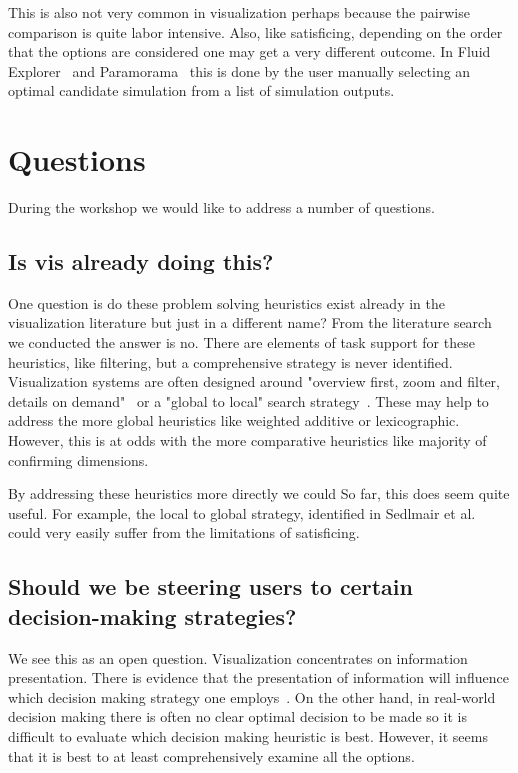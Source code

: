 This is also not very common in visualization perhaps because the pairwise
comparison is quite labor intensive. Also, like satisficing, depending on the
order that the options are considered one may get a very different outcome. In
Fluid Explorer~\cite{Bruckner:2010} and Paramorama~\citep{Pretorius:2011} this
is done by the user manually selecting an optimal candidate simulation from 
a list of simulation outputs.


\section{Questions}\label{questions}

During the workshop we would like to address a number of questions.

\subsection{Is vis already doing this?}
\label{is-vis-already-doing-this}

One question is do these problem solving heuristics exist already in the
visualization literature but just in a different name? From the literature
search we conducted the answer is no. There are elements of task support for
these heuristics, like filtering, but a comprehensive strategy is never
identified. Visualization systems are often designed around 
"overview first, zoom and filter, details on demand"~\cite{Shneiderman:1996} or
a "global to local" search strategy~\cite{Sedlmair:2014}. These may help to
address the more global heuristics like weighted additive or lexicographic.
However, this is at odds with the more comparative heuristics like majority
of confirming dimensions. 

By addressing these heuristics more directly we could 
So far, this does seem quite useful. For example, the local to global
strategy, identified in Sedlmair et al.~\citep{Sedlmair:2014} could very
easily suffer from the limitations of satisficing.

\subsection{Should we be steering users to certain decision-making strategies?}

We see this as an open question. Visualization concentrates on information
presentation. There is evidence that the presentation of information will
influence which decision making strategy one employs~\citep{Jarvenpaa:1990}.
On the other hand, in real-world decision making there is often no clear
optimal decision to be made so it is difficult to evaluate which decision
making heuristic is best. However, it seems that it is best to at least
comprehensively examine all the options.

